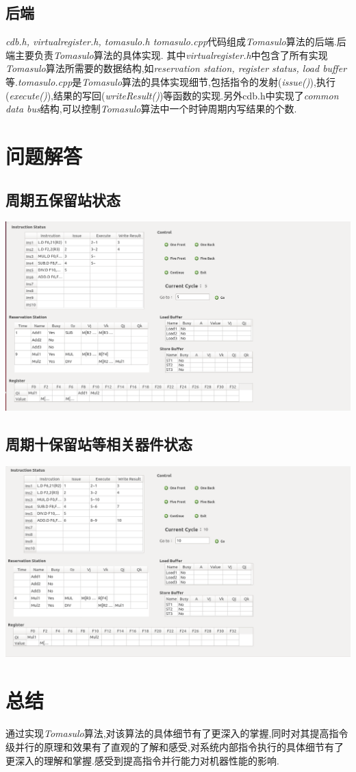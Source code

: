 \documentclass{paper}
\begin{document}
	\subsection*{后端} \textit{cdb.h, virtualregister.h, tomasulo.h tomasulo.cpp}代码组成\textit{Tomasulo}算法的后端.后端主要负责\textit{Tomasulo}算法的具体实现. 其中\textit{virtualregister.h}中包含了所有实现\textit{Tomasulo}算法所需要的数据结构,如\textit{reservation station, register status, load buffer}等.\textit{tomasulo.cpp}是\textit{Tomasulo}算法的具体实现细节,包括指令的发射(\textit{issue()}),执行(\textit{execute()}),结果的写回(\textit{writeResult()})等函数的实现.另外cdb.h中实现了\textit{common data bus}结构,可以控制\textit{Tomasulo}算法中一个时钟周期内写结果的个数.

\section{问题解答}
	\subsection*{周期五保留站状态}
	\begin{center}
		\includegraphics[width=.8\textwidth]{./cycle5.png}
	\end{center}
	\subsection*{周期十保留站等相关器件状态}
	\begin{center}
		\includegraphics[width=.8\textwidth]{./cycle10.png}
	\end{center}
\section{总结}
	\paragraph{} 通过实现\textit{Tomasulo}算法,对该算法的具体细节有了更深入的掌握,同时对其提高指令级并行的原理和效果有了直观的了解和感受,对系统内部指令执行的具体细节有了更深入的理解和掌握.感受到提高指令并行能力对机器性能的影响.
\end{document}
